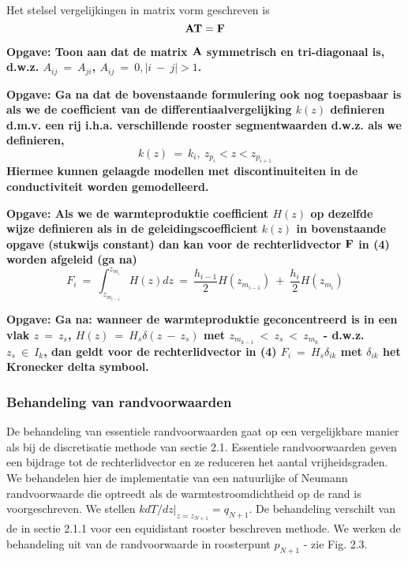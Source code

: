 \noindent
Het stelsel vergelijkingen in matrix vorm geschreven is
\begin{equation}
\bf {A T } = \bf F
\end{equation}

\vspace{0.25in}
\noindent
\bf Opgave:\rm
\newline
\small
Toon aan dat de matrix $\bf A$ symmetrisch en tri-diagonaal is, d.w.z.
$A_{ij}\ =\ A_{ji}$, $A_{ij}\ =\ 0, |i\ -\ j| > 1$.
\normalsize

\vspace{0.25in}
\noindent
\bf Opgave:\rm
\newline
\small
Ga na dat de bovenstaande formulering ook nog toepasbaar is als we de
coefficient van de differentiaalvergelijking $k(z)$ definieren d.m.v.
een rij i.h.a. verschillende rooster segmentwaarden d.w.z. als we 
definieren,
\begin{equation}
k(z) \ =\ k_i ,\ z_{p_i} < z < z_{p_{i+1}}
\end{equation}
Hiermee kunnen gelaagde modellen met discontinuiteiten in de 
conductiviteit worden gemodelleerd.
\normalsize

\vspace{0.25in}
\noindent
\bf Opgave:\rm
\newline
\small
Als we de warmteproduktie coefficient $H(z)$ op dezelfde wijze 
definieren als in de geleidingscoefficient $k(z)$ in bovenstaande opgave
(stukwijs constant)
dan kan voor de rechterlidvector $\bf F$ in (4) worden afgeleid (ga na)
\begin{equation}
F_i \ =\ 
\int_{z_{m_{i-1}}} ^{z_{m_{i}}}
    H(z) dz
\ =\ 
\frac {h_{i-1}}{2} H(z_{m_{i-1}} ) \ +\ 
\frac {h_{i}}  {2} H(z_{m_{i}} )
\end{equation}
\normalsize

\vspace{0.25in}
\noindent
\bf Opgave:\rm
\newline
\small
Ga na: wanneer de warmteproduktie geconcentreerd is in een vlak
$z\ =\ z_s$, $H(z)\ =\ H_s \delta (z\ -\ z_s )$
met $z_{m_{k-1}}\ <\ z_s \ <\ z_{m_{k}}$ - d.w.z.
$z_s\ \in \ I_k$,
dan geldt voor de rechterlidvector in (4)
$F_i\ =\ H_s \delta_{ik}$
met $\delta_{ik}$ het Kronecker delta symbool.
\normalsize
\subsubsection{Behandeling van randvoorwaarden}
De behandeling van essentiele randvoorwaarden gaat op een vergelijkbare
manier als bij de discretisatie methode van sectie 2.1.
Essentiele randvoorwaarden geven een bijdrage tot de rechterlidvector
en ze reduceren het aantal vrijheidsgraden.
We behandelen hier de implementatie van een natuurlijke of Neumann 
randvoorwaarde die optreedt als de warmtestroomdichtheid op de
rand is voorgeschreven.
We stellen $k dT/dz |_{z=z_{N+1}} = q_{N+1}$.
De behandeling verschilt van de in sectie 2.1.1 voor een equidistant
rooster beschreven methode.
We werken de behandeling uit van de randvoorwaarde in roosterpunt
$p_{N+1}$ - zie Fig. 2.3.

